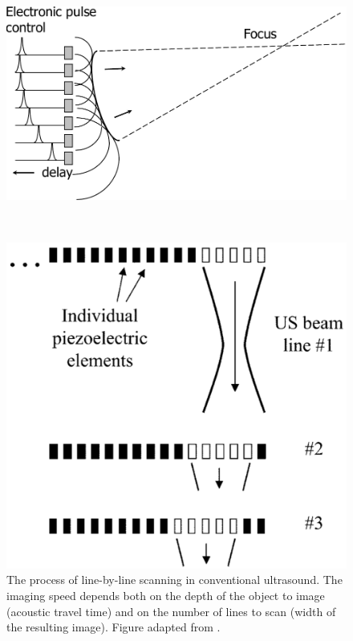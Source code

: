 \begin{figure}[t]
\begin{minipage}[t]{.48\textwidth}
  \centering
  \includegraphics[width=.9\linewidth]{Figures/Ultrasound/ultrasound_focused_beam_v2.pdf}
  \label{fig:us_focus_beam}
\end{minipage} $\quad$
\begin{minipage}[t]{.48\textwidth}
  \centering
    \includegraphics[width=.75\linewidth]{Figures/Ultrasound/conventional_line_scanning.png}
    \caption{The process of line-by-line scanning in conventional ultrasound. The imaging speed depends both on the depth of the object to image (acoustic travel time) and on the number of lines to scan (width of the resulting image). Figure adapted from \citet{hangiandreou_aapm/rsna_2003}.}
    \label{fig:us_line-by-line}
\end{minipage}
\end{figure}


